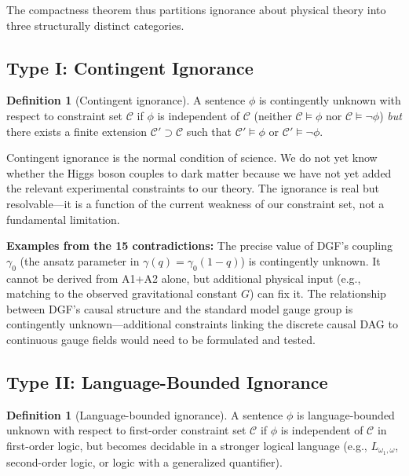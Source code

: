 \documentclass[12pt,a4paper]{article}
\theoremstyle{definition}
\newtheorem{definition}[theorem]{Definition}
\theoremstyle{remark}
\begin{document}
The compactness theorem thus partitions ignorance about physical theory into three structurally distinct categories.

\subsection{Type I: Contingent Ignorance}

\begin{definition}[Contingent ignorance]
A sentence $\phi$ is contingently unknown with respect to constraint set $\mathcal{C}$ if $\phi$ is independent of $\mathcal{C}$ (neither $\mathcal{C} \models \phi$ nor $\mathcal{C} \models \neg\phi$) \emph{but} there exists a finite extension $\mathcal{C}' \supset \mathcal{C}$ such that $\mathcal{C}' \models \phi$ or $\mathcal{C}' \models \neg\phi$.
\end{definition}

Contingent ignorance is the normal condition of science. We do not yet know whether the Higgs boson couples to dark matter because we have not yet added the relevant experimental constraints to our theory. The ignorance is real but resolvable---it is a function of the current weakness of our constraint set, not a fundamental limitation.

\textbf{Examples from the 15 contradictions:} The precise value of DGF's coupling $\gamma_0$ (the ansatz parameter in $\gamma(q) = \gamma_0(1-q)$) is contingently unknown. It cannot be derived from A1+A2 alone, but additional physical input (e.g., matching to the observed gravitational constant $G$) can fix it. The relationship between DGF's causal structure and the standard model gauge group is contingently unknown---additional constraints linking the discrete causal DAG to continuous gauge fields would need to be formulated and tested.

\subsection{Type II: Language-Bounded Ignorance}

\begin{definition}[Language-bounded ignorance]
A sentence $\phi$ is language-bounded unknown with respect to first-order constraint set $\mathcal{C}$ if $\phi$ is independent of $\mathcal{C}$ in first-order logic, but becomes decidable in a stronger logical language (e.g., $L_{\omega_1,\omega}$, second-order logic, or logic with a generalized quantifier).
\end{definition}
\end{document}
